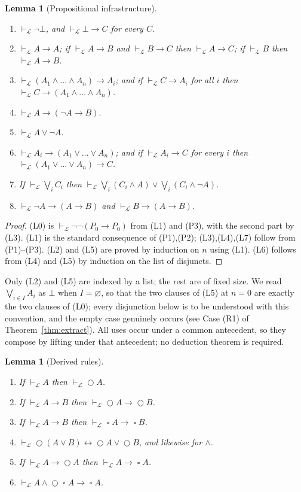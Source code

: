 \documentclass[11pt,a4paper]{article}
\newtheorem{lemma}[theorem]{Lemma}
\theoremstyle{definition}
\newcommand{\Next}{\mathop{\bigcirc}}
\newcommand{\Always}{\mathop{\square}}
\newcommand{\proves}{\vdash_{\mathcal{L}}}
\begin{document}
\begin{lemma}[Propositional infrastructure]\label{lem:pc}
\leavevmode
\begin{enumerate}
\item[(L0)] $\proves\neg\bot$, and $\proves\bot\to C$ for every $C$.
\item[(L1)] $\proves A\to A$; if $\proves A\to B$ and $\proves B\to C$ then
  $\proves A\to C$; if $\proves B$ then $\proves A\to B$.
\item[(L2)] $\proves(A_1\wedge\dots\wedge A_n)\to A_i$; and if
  $\proves C\to A_i$ for all $i$ then $\proves C\to(A_1\wedge\dots\wedge A_n)$.
\item[(L3)] $\proves A\to(\neg A\to B)$.
\item[(L4)] $\proves A\vee\neg A$.
\item[(L5)] $\proves A_i\to(A_1\vee\dots\vee A_n)$; and if $\proves A_i\to C$ for
  every $i$ then $\proves(A_1\vee\dots\vee A_n)\to C$.
\item[(L6)] If $\proves\bigvee_i C_i$ then
  $\proves\bigvee_i(C_i\wedge A)\vee\bigvee_i(C_i\wedge\neg A)$.
\item[(L7)] $\proves\neg A\to(A\to B)$ and $\proves B\to(A\to B)$.
\end{enumerate}
\end{lemma}

\begin{proof}
(L0) is $\proves\neg\neg(P_0\to P_0)$ from (L1) and (P3), with the second part
by (L3).  (L1) is the standard consequence of (P1),(P2); (L3),(L4),(L7) follow
from (P1)--(P3).  (L2) and (L5) are proved by induction on $n$ using (L1).  (L6)
follows from (L4) and (L5) by induction on the list of disjuncts.
\end{proof}

Only (L2) and (L5) are indexed by a list; the rest are of fixed size.  We read
$\bigvee_{i\in I}A_i$ as $\bot$ when $I=\varnothing$, so that the two clauses of
(L5) at $n=0$ are exactly the two clauses of (L0); every disjunction below is to
be understood with this convention, and the empty case genuinely occurs (see
Case (R1) of Theorem~\ref{thm:extract}).  All uses occur under a common
antecedent, so they compose by lifting under that antecedent; no deduction
theorem is required.

\begin{lemma}[Derived rules]\label{lem:derived}
\leavevmode
\begin{enumerate}
\item[(D1)] If $\proves A$ then $\proves\Next A$.
\item[(D2)] If $\proves A\to B$ then $\proves\Next A\to\Next B$.
\item[(D3)] If $\proves A\to B$ then $\proves\Always A\to\Always B$.
\item[(D4)] $\proves\Next(A\vee B)\leftrightarrow\Next A\vee\Next B$, and
  likewise for $\wedge$.
\item[(D5)] If $\proves A\to\Next A$ then $\proves A\to\Always A$.
\item[(D6)] $\proves A\wedge\Next\Always A\to\Always A$.
\end{enumerate}
\end{lemma}
\end{document}
